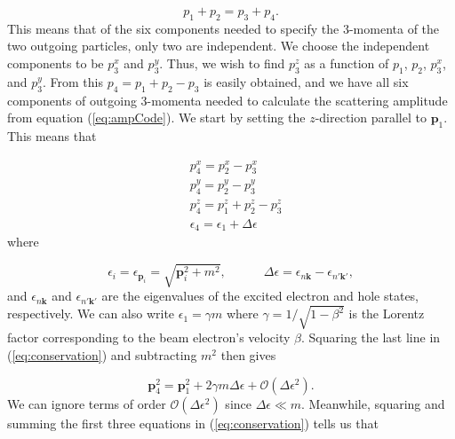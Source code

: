 \documentclass{article}
\begin{document}
\begin{equation}
    p_1 + p_2 = p_3 + p_4.
\end{equation}
%
This means that of the six components needed to specify the 3-momenta of the
two outgoing particles, only two are independent.
We choose the independent components to be $p^x_3$ and $p^y_3$.  Thus, we wish
to find $p^z_3$ as a function of $p_1$, $p_2$, $p^x_3$, and $p^y_3$.
From this $p_4 = p_1 + p_2 - p_3$ is easily obtained, and we have all six
components of outgoing 3-momenta needed to calculate the scattering amplitude
from equation (\ref{eq:ampCode}).
We start by setting the $z$-direction parallel to $\mathbf{p}_1$.
This means that

\begin{equation}
\label{eq:conservation}
    \begin{aligned}
        &p^x_4 = p^x_2 - p^x_3
        \\&p^y_4 = p^y_2 - p^y_3
        \\&p^z_4 = p^z_1 + p^z_2 - p^z_3
        \\&\epsilon_4 = \epsilon_1 + \Delta\epsilon
    \end{aligned}
\end{equation}
%
where

\begin{equation}
  \epsilon_i = \epsilon_{\mathbf{p}_i} = \sqrt{\mathbf{p}_i^2 + m^2},
  \qquad\quad
  \Delta\epsilon = \epsilon_{n\mathbf{k}} - \epsilon_{n'\mathbf{k'}},
\end{equation}
%
and $\epsilon_{n\mathbf{k}}$ and $\epsilon_{n'\mathbf{k'}}$ are the eigenvalues
of the excited electron and hole states, respectively.
We can also write $\epsilon_1 = \gamma m$ where $\gamma=1/\sqrt{1-\beta^2}$ is
the Lorentz factor corresponding to the beam electron's velocity $\beta$.
Squaring the last line in (\ref{eq:conservation}) and subtracting $m^2$ then
gives

\begin{equation}
  \mathbf{p}_4^2
  =
  \mathbf{p}_1^2 + 2\gamma m\Delta\epsilon + \mathcal{O}(\Delta\epsilon^2).
  \label{eq:p41}
\end{equation}
%
We can ignore terms of order $\mathcal{O}(\Delta\epsilon^2)$ since
$\Delta\epsilon\ll m$.  Meanwhile, squaring and summing the first three
equations in (\ref{eq:conservation}) tells us that
\end{document}
